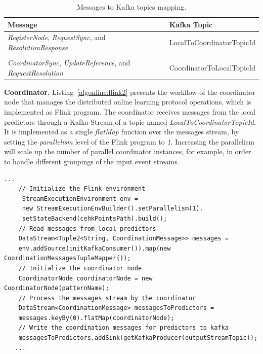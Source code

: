  
\begin{center}
\centering
\begin{table}[h]
	\caption{Messages to Kafka topics mapping.}
	\label{tab:messagesToTopics}
	\begin{tabular}{p{8cm}l}
		\toprule
		Message &Kafka Topic\\
		\midrule
		\parbox[t]{8cm}{\textit{RegisterNode}, \textit{RequestSync},  and \textit{ResolutionResponse} } & LocalToCoordinatorTopicId\\ \\
		
			  \parbox[t]{8cm}{\textit{CoordinatorSync}, \textit{UpdateReference}, and \\ \textit{RequestResolution}} & CoordinatorToLocalTopicId\\
		\bottomrule
	\end{tabular}
\end{table}

\end{center}

\textbf{Coordinator.} Listing~\ref{algonline:flink2} presents the workflow of the coordinator node that manages the distributed online learning protocol operations, which is implemented as Flink program. The coordinator receives messages from the local predictors through a Kafka Stream of a topic named \textit{LocalToCoordinatorTopicId}. It is implemented as a single \textit{flatMap} function over the messages stream, by setting the \textit{parallelism} level of the Flink program to \textit{1}. Increasing the parallelism will scale up the number of parallel coordinator instances, for example, in order to handle different groupings of the input event streams. 
\begin{center}
	\centering
\begin{lstlisting}[caption={The coordinator Flink program.},label={algonline:flink2},frame=single]
    ...
	// Initialize the Flink environment	 
	 StreamExecutionEnvironment env =
	 new StreamExecutionEnvBuilder().setParallelism(1).
	 setStateBackend(cehkPointsPath).build();	 
	// Read messages from local predictors
	DataStream<Tuple2<String, CoordinationMessage>> messages =
	env.addSource(initKafkaConsumer()).map(new CoordinationMessagesTupleMapper());	
	// Initialize the coordinator node
	CoordinatorNode coordinatorNode = new CoordinatorNode(patternName);	
	// Process the messages stream by the coordinator
	DataStream<CoordinationMessage> messagesToPredictors =
	messages.keyBy(0).flatMap(coordinatorNode);	
	// Write the coordination messages for predictors to kafka
	messagesToPredictors.addSink(getKafkaProducer(outputStreamTopic));
   ...
\end{lstlisting}
\end{center}

